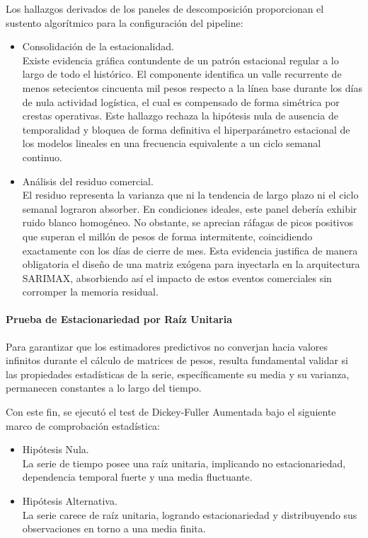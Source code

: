 \documentclass[11pt,a4paper]{report}
\begin{document}
        Los hallazgos derivados de los paneles de descomposición proporcionan el sustento algorítmico para la configuración del pipeline:
        \begin{itemize}
            \item Consolidación de la estacionalidad.\\
            Existe evidencia gráfica contundente de un patrón estacional regular a lo largo de todo el histórico.
            El componente identifica un valle recurrente de menos setecientos cincuenta mil pesos respecto a la línea
            base durante los días de nula actividad logística, el cual es compensado de forma simétrica por crestas operativas.
            Este hallazgo rechaza la hipótesis nula de ausencia de temporalidad y bloquea de forma definitiva el hiperparámetro estacional
            de los modelos lineales en una frecuencia equivalente a un ciclo semanal continuo.

            \item Análisis del residuo comercial.\\
            El residuo representa la varianza que ni la tendencia de largo plazo ni el ciclo semanal lograron absorber.
            En condiciones ideales, este panel debería exhibir ruido blanco homogéneo. No obstante, se aprecian ráfagas de
            picos positivos que superan el millón de pesos de forma intermitente, coincidiendo exactamente con los días de cierre de mes.
            Esta evidencia justifica de manera obligatoria el diseño de una matriz exógena para inyectarla en la arquitectura SARIMAX,
            absorbiendo así el impacto de estos eventos comerciales sin corromper la memoria residual.
        \end{itemize}

        \paragraph{Prueba de Estacionariedad por Raíz Unitaria}
        Para garantizar que los estimadores predictivos no converjan hacia valores infinitos durante el cálculo de matrices de pesos,
        resulta fundamental validar si las propiedades estadísticas de la serie, específicamente su media y su varianza, permanecen constantes a lo largo del tiempo. 

        Con este fin, se ejecutó el test de Dickey-Fuller Aumentada bajo el siguiente marco de comprobación estadística:
        \begin{itemize}
            \item Hipótesis Nula.\\La serie de tiempo posee una raíz unitaria, implicando no estacionariedad, dependencia temporal fuerte y una media fluctuante.
            \item Hipótesis Alternativa.\\La serie carece de raíz unitaria, logrando estacionariedad y distribuyendo sus observaciones en torno a una media finita.
        \end{itemize}
\end{document}
